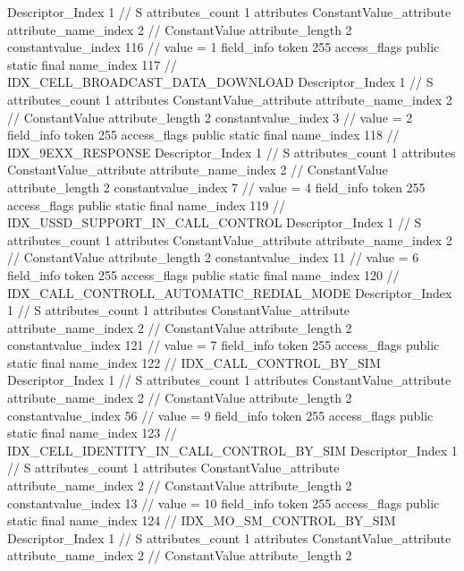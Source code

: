 {{{{{				Descriptor_Index	1		// S
				attributes_count	1
				attributes {
				ConstantValue_attribute {
					attribute_name_index	2		// ConstantValue
					attribute_length	2
					constantvalue_index	116		// value = 1
				}
				}
			}
			field_info {
				token	255
				access_flags	public static final
				name_index	117		// IDX_CELL_BROADCAST_DATA_DOWNLOAD
				Descriptor_Index	1		// S
				attributes_count	1
				attributes {
				ConstantValue_attribute {
					attribute_name_index	2		// ConstantValue
					attribute_length	2
					constantvalue_index	3		// value = 2
				}
				}
			}
			field_info {
				token	255
				access_flags	public static final
				name_index	118		// IDX_9EXX_RESPONSE
				Descriptor_Index	1		// S
				attributes_count	1
				attributes {
				ConstantValue_attribute {
					attribute_name_index	2		// ConstantValue
					attribute_length	2
					constantvalue_index	7		// value = 4
				}
				}
			}
			field_info {
				token	255
				access_flags	public static final
				name_index	119		// IDX_USSD_SUPPORT_IN_CALL_CONTROL
				Descriptor_Index	1		// S
				attributes_count	1
				attributes {
				ConstantValue_attribute {
					attribute_name_index	2		// ConstantValue
					attribute_length	2
					constantvalue_index	11		// value = 6
				}
				}
			}
			field_info {
				token	255
				access_flags	public static final
				name_index	120		// IDX_CALL_CONTROLL_AUTOMATIC_REDIAL_MODE
				Descriptor_Index	1		// S
				attributes_count	1
				attributes {
				ConstantValue_attribute {
					attribute_name_index	2		// ConstantValue
					attribute_length	2
					constantvalue_index	121		// value = 7
				}
				}
			}
			field_info {
				token	255
				access_flags	public static final
				name_index	122		// IDX_CALL_CONTROL_BY_SIM
				Descriptor_Index	1		// S
				attributes_count	1
				attributes {
				ConstantValue_attribute {
					attribute_name_index	2		// ConstantValue
					attribute_length	2
					constantvalue_index	56		// value = 9
				}
				}
			}
			field_info {
				token	255
				access_flags	public static final
				name_index	123		// IDX_CELL_IDENTITY_IN_CALL_CONTROL_BY_SIM
				Descriptor_Index	1		// S
				attributes_count	1
				attributes {
				ConstantValue_attribute {
					attribute_name_index	2		// ConstantValue
					attribute_length	2
					constantvalue_index	13		// value = 10
				}
				}
			}
			field_info {
				token	255
				access_flags	public static final
				name_index	124		// IDX_MO_SM_CONTROL_BY_SIM
				Descriptor_Index	1		// S
				attributes_count	1
				attributes {
				ConstantValue_attribute {
					attribute_name_index	2		// ConstantValue
					attribute_length	2
}}}}}}}
